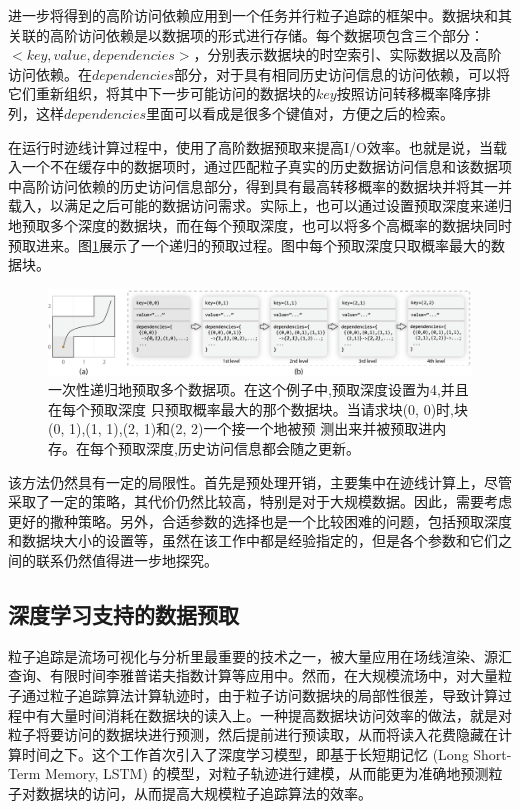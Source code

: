 进一步将得到的高阶访问依赖应用到一个任务并行粒子追踪的框架中。数据块和其关联的高阶访问依赖是以数据项的形式进行存储。每个数据项包含三个部分：$<key, value, dependencies>$，分别表示数据块的时空索引、实际数据以及高阶访问依赖。在$dependencies$部分，对于具有相同历史访问信息的访问依赖，可以将它们重新组织，将其中下一步可能访问的数据块的$key$按照访问转移概率降序排列，这样$dependencies$里面可以看成是很多个键值对，方便之后的检索。

在运行时迹线计算过程中，使用了高阶数据预取来提高I/O效率。也就是说，当载入一个不在缓存中的数据项时，通过匹配粒子真实的历史数据访问信息和该数据项中高阶访问依赖的历史访问信息部分，得到具有最高转移概率的数据块并将其一并载入，以满足之后可能的数据访问需求。实际上，也可以通过设置预取深度来递归地预取多个深度的数据块，而在每个预取深度，也可以将多个高概率的数据块同时预取进来。图\ref{fig:highorder_fig4}展示了一个递归的预取过程。图中每个预取深度只取概率最大的数据块。

\begin{figure}[!tb]
  \centering
  \includegraphics[width=\linewidth]{image/prefetch/highorder_fig4.png}
  \caption{
    一次性递归地预取多个数据项\parencite{ZhangGY16}。在这个例子中,预取深度设置为4,并且在每个预取深度 只预取概率最大的那个数据块。当请求块(0, 0)时,块(0, 1),(1, 1),(2, 1)和(2, 2)一个接一个地被预 测出来并被预取进内存。在每个预取深度,历史访问信息都会随之更新。
  }
  \label{fig:highorder_fig4}
\end{figure}


该方法仍然具有一定的局限性。首先是预处理开销，主要集中在迹线计算上，尽管采取了一定的策略，其代价仍然比较高，特别是对于大规模数据。因此，需要考虑更好的撒种策略。另外，合适参数的选择也是一个比较困难的问题，包括预取深度和数据块大小的设置等，虽然在该工作中都是经验指定的，但是各个参数和它们之间的联系仍然值得进一步地探究。

\subsection{深度学习支持的数据预取}
粒子追踪是流场可视化与分析里最重要的技术之一，被大量应用在场线渲染、源汇查询、有限时间李雅普诺夫指数计算等应用中。然而，在大规模流场中，对大量粒子通过粒子追踪算法计算轨迹时，由于粒子访问数据块的局部性很差，导致计算过程中有大量时间消耗在数据块的读入上。一种提高数据块访问效率的做法，就是对粒子将要访问的数据块进行预测，然后提前进行预读取，从而将读入花费隐藏在计算时间之下。这个工作\parencite{Hong2018LSTM}首次引入了深度学习模型，即基于长短期记忆 (Long Short-Term Memory, LSTM) 的模型，对粒子轨迹进行建模，从而能更为准确地预测粒子对数据块的访问，从而提高大规模粒子追踪算法的效率。

